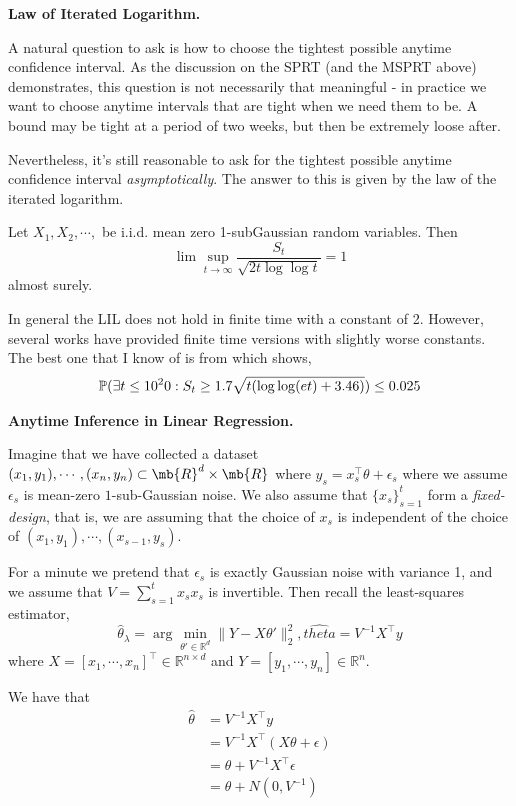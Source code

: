 \noindent\textbf{Law of Iterated Logarithm.}

A natural question to ask is how to choose the tightest possible anytime confidence interval. As the discussion on the SPRT (and the MSPRT above) demonstrates, this question is not necessarily that meaningful - in practice we want to choose anytime intervals that are tight when we need them to be. A bound may be tight at a period of two weeks, but then be extremely loose after.  

Nevertheless, it's still reasonable to ask for the tightest possible anytime confidence interval \textit{asymptotically}. The answer to this is given by the law of the iterated logarithm.

\begin{theorem}
    Let $X_1, X_2, \cdots, $ be i.i.d. mean zero 1-subGaussian random variables. Then \[\lim\sup_{t\rightarrow \infty} \frac{S_t}{\sqrt{2t\log\log t}} = 1\] almost surely.
\end{theorem}

In general the LIL does not hold in finite time with a constant of 2. However, several works have provided finite time versions with slightly worse constants. The best one that I know of is from \cite{howard2021time} which shows,
\[\P(\exists t\leq 10^20: S_t\geq 1.7\sqrt{t(\log\log(e t) + 3.46)})\leq 0.025\]


\noindent \textbf{Anytime Inference in Linear Regression.} 

Imagine that we have collected a dataset $(x_1, y_1), \cdots, (x_n, y_n) \subset \mb{R}^d \times \mb{R}$ where $y_s = x_s^{\top}\theta + \epsilon_s$ where we assume $\epsilon_s$ is mean-zero $1$-sub-Gaussian noise. We also assume that $\{x_s\}_{s=1}^t$ form a \textit{fixed-design}, that is, we are assuming that the choice of $x_s$ is independent of the choice of $(x_1, y_1), \cdots, (x_{s-1}, y_s)$. 

For a minute we pretend that $\epsilon_s$ is exactly Gaussian noise with variance 1, and we assume that $V = \sum_{s=1}^t x_s x_s$ is invertible. Then recall the least-squares estimator,
\[\hat\theta_{\lambda} = \arg\min_{\theta' \in \mathbb{R}^d} \|Y - X\theta'\|^2_2, \hat{theta} = V^{-1} X^{\top} y\]
where $X = [x_1, \cdots, x_n]^{\top} \in \mathbb{R}^{n\times d}$ and $Y = [y_1, \cdots, y_n]\in\mathbb{R}^n$. 

We have that 
\begin{align*}
    \hat{\theta}
    &= V^{-1} X^{\top} y\\
    &= V^{-1} X^{\top} ( X\theta + \epsilon)\\
    &= \theta + V^{-1} X^{\top}\epsilon\\
    &= \theta + N(0, V^{-1})
\end{align*}

